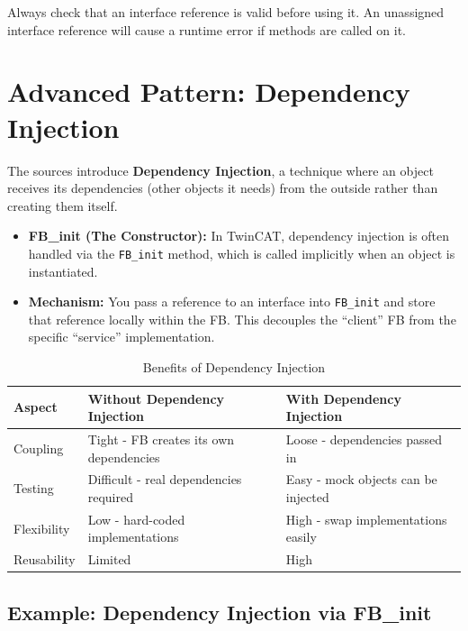 \documentclass[11pt,a4paper]{article}
\begin{document}
\begin{warningbox}
Always check that an interface reference is valid before using it. An unassigned interface reference will cause a runtime error if methods are called on it.
\end{warningbox}

\section{Advanced Pattern: Dependency Injection}

The sources introduce \textbf{Dependency Injection}, a technique where an object receives its dependencies (other objects it needs) from the outside rather than creating them itself.

\begin{itemize}[leftmargin=*]
    \item \textbf{FB\_init (The Constructor):} In TwinCAT, dependency injection is often handled via the \texttt{FB\_init} method, which is called implicitly when an object is instantiated.
    
    \item \textbf{Mechanism:} You pass a reference to an interface into \texttt{FB\_init} and store that reference locally within the FB. This decouples the ``client'' FB from the specific ``service'' implementation.
\end{itemize}

\begin{table}[h]
\centering
\begin{tabular}{@{}lp{5cm}p{5cm}@{}}
\toprule
\textbf{Aspect} & \textbf{Without Dependency Injection} & \textbf{With Dependency Injection} \\
\midrule
Coupling & Tight - FB creates its own dependencies & Loose - dependencies passed in \\
Testing & Difficult - real dependencies required & Easy - mock objects can be injected \\
Flexibility & Low - hard-coded implementations & High - swap implementations easily \\
Reusability & Limited & High \\
\bottomrule
\end{tabular}
\caption{Benefits of Dependency Injection}
\end{table}

\subsection*{Example: Dependency Injection via FB\_init}
\end{document}

